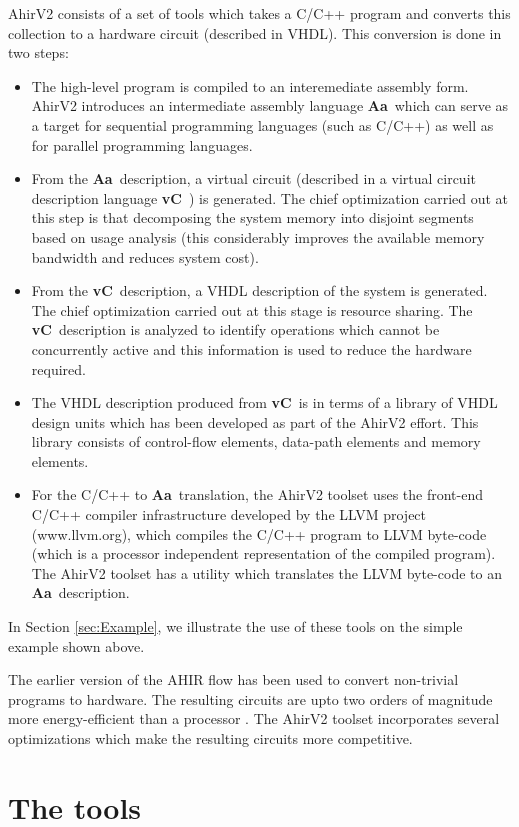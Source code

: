 \documentclass{article}
\newcommand{\Aa}{{\bf Aa}~}
\newcommand{\vC}{{\bf vC}~}
\begin{document}
AhirV2 consists of a set of tools which takes
a C/C++ program and converts this collection to
a hardware circuit (described in VHDL).   This
conversion is done in two steps:
\begin{itemize}
\item The high-level program is compiled
to an interemediate assembly form.  AhirV2
introduces an intermediate assembly language
\Aa  which can serve as a target for sequential
programming languages (such as C/C++) as
well as for parallel programming languages.
\item From the \Aa description, a virtual
circuit (described in a virtual circuit
description language \vC) is generated.
The chief optimization carried out at this
step is that decomposing the system memory
into disjoint segments based on usage
analysis (this considerably improves the
available memory bandwidth and reduces
system cost).
\item From the \vC description, a
VHDL description of the system is generated.
The chief optimization carried out at this
stage is resource sharing.  The \vC description
is analyzed to identify operations which
cannot be concurrently active and this information
is used to reduce the hardware required.
\item 
The VHDL description produced from 
\vC is in terms of a library
of VHDL design units which has been developed
as part of the AhirV2  effort.  This library
consists of control-flow elements, data-path
elements and memory elements.
\item 
For the C/C++ to \Aa translation, the
AhirV2 toolset uses the front-end C/C++ compiler
infrastructure developed by the LLVM project (www.llvm.org), which
compiles the C/C++ program to LLVM byte-code
(which is a processor independent representation
of the compiled program).  The AhirV2 toolset
has a utility which translates the LLVM byte-code
to an \Aa description.
\end{itemize}
In Section \ref{sec:Example}, 
we illustrate the use of these tools on the
simple example shown above.

The earlier version of the AHIR flow has been
used to convert non-trivial programs to hardware.
The resulting circuits are upto two orders of
magnitude more energy-efficient than
a processor \cite{ref:dsd2010}.  The AhirV2
toolset incorporates several optimizations which
make the resulting circuits more 
competitive. 

\section{The tools}
\end{document}
